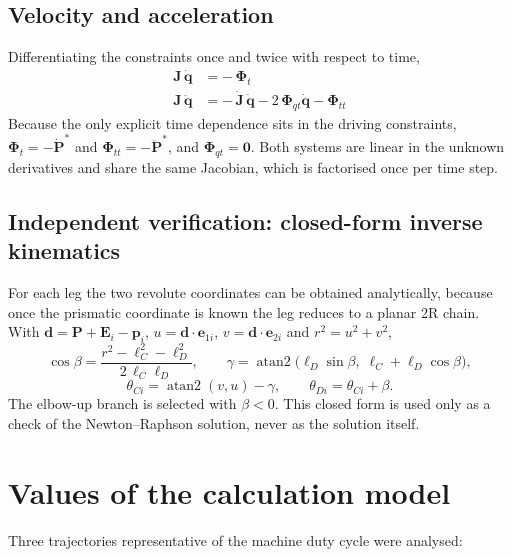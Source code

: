 \documentclass[11pt]{article}
\begin{document}
\subsection{Velocity and acceleration}

Differentiating the constraints once and twice with respect to time,
\begin{align}
\bm J\,\dot{\bm q} &= -\,\bm\Phi_t \\
\bm J\,\ddot{\bm q} &= -\,\dot{\bm J}\,\dot{\bm q} - 2\,\bm\Phi_{qt}\dot{\bm q} - \bm\Phi_{tt}
\end{align}
Because the only explicit time dependence sits in the driving constraints,
$\bm\Phi_t=-\dot{\bm P}^{\ast}$ and $\bm\Phi_{tt}=-\ddot{\bm P}^{\ast}$, and
$\bm\Phi_{qt}=\bm 0$. Both systems are linear in the unknown derivatives and share the
same Jacobian, which is factorised once per time step.

\subsection{Independent verification: closed-form inverse kinematics}

For each leg the two revolute coordinates can be obtained analytically, because once the
prismatic coordinate is known the leg reduces to a planar 2R chain. With
$\bm d = \bm P+\bm E_i-\bm p_i$, $u=\bm d\cdot\bm e_{1i}$, $v=\bm d\cdot\bm e_{2i}$ and
$r^2=u^2+v^2$,
\begin{equation}
\cos\beta=\frac{r^2-\ell_C^2-\ell_D^2}{2\,\ell_C\ell_D},\qquad
\gamma=\operatorname{atan2}\!\bigl(\ell_D\sin\beta,\;\ell_C+\ell_D\cos\beta\bigr),
\end{equation}
\begin{equation}
\theta_{Ci}=\operatorname{atan2}(v,u)-\gamma,\qquad \theta_{Di}=\theta_{Ci}+\beta .
\end{equation}
The elbow-up branch is selected with $\beta<0$. This closed form is used only as a check
of the Newton--Raphson solution, never as the solution itself.

\section{Values of the calculation model}\label{sec:kin-val}

Three trajectories representative of the machine duty cycle were analysed:
\end{document}

